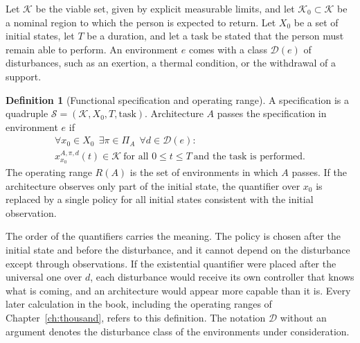 \documentclass[11pt,openany]{book}
\theoremstyle{definition}
\newtheorem{definition}{Definition}[chapter]
\theoremstyle{remark}
\newcommand{\Kset}{\mathcal{K}}
\newcommand{\Dset}{\mathcal{D}}
\newcommand{\Spec}{\mathcal{S}}
\begin{document}
Let $\Kset$ be the viable set, given by explicit measurable limits, and let $\Kset_0\subset\Kset$ be a nominal region to which the person is expected to return. Let $X_0$ be a set of initial states, let $T$ be a duration, and let a task be stated that the person must remain able to perform. An environment $e$ comes with a class $\Dset(e)$ of disturbances, such as an exertion, a thermal condition, or the withdrawal of a support.

\begin{definition}[Functional specification and operating range]
\label{def:spec}
A specification is a quadruple $\Spec=(\Kset,X_0,T,\text{task})$. Architecture $A$ passes the specification in environment $e$ if
\[\begin{gathered}
\forall x_0\in X_0\ \ \exists\pi\in\Pi_A\ \ \forall d\in\Dset(e):\\ x^{A,\pi,d}_{x_0}(t)\in\Kset\ \text{for all }0\le t\le T\ \text{and the task is performed.}
\end{gathered}\]
The operating range $R(A)$ is the set of environments in which $A$ passes. If the architecture observes only part of the initial state, the quantifier over $x_0$ is replaced by a single policy for all initial states consistent with the initial observation.
\end{definition}

The order of the quantifiers carries the meaning. The policy is chosen after the initial state and before the disturbance, and it cannot depend on the disturbance except through observations. If the existential quantifier were placed after the universal one over $d$, each disturbance would receive its own controller that knows what is coming, and an architecture would appear more capable than it is. Every later calculation in the book, including the operating ranges of Chapter~\ref{ch:thousand}, refers to this definition. The notation $\Dset$ without an argument denotes the disturbance class of the environments under consideration.
\end{document}
